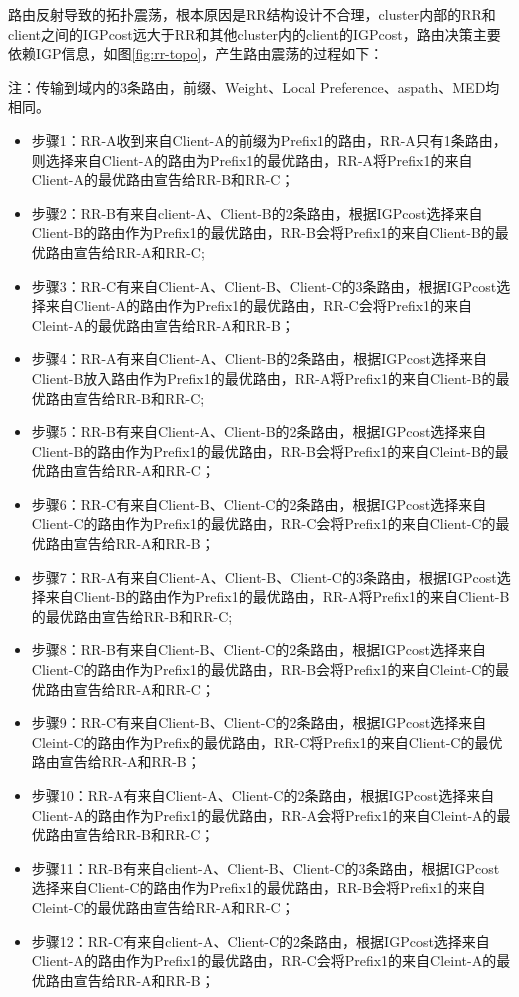 路由反射导致的拓扑震荡，根本原因是RR结构设计不合理，cluster内部的RR和client之间的IGPcost远大于RR和其他cluster内的client的IGPcost，路由决策主要依赖IGP信息，如图\ref{fig:rr-topo}，产生路由震荡的过程如下：

注：传输到域内的3条路由，前缀、Weight、Local Preference、aspath、MED均相同。

\begin{itemize}
\item 步骤1：RR-A收到来自Client-A的前缀为Prefix1的路由，RR-A只有1条路由，则选择来自Client-A的路由为Prefix1的最优路由，RR-A将Prefix1的来自Client-A的最优路由宣告给RR-B和RR-C；
\item 步骤2：RR-B有来自client-A、Client-B的2条路由，根据IGPcost选择来自Client-B的路由作为Prefix1的最优路由，RR-B会将Prefix1的来自Client-B的最优路由宣告给RR-A和RR-C;
\item 步骤3：RR-C有来自Client-A、Client-B、Client-C的3条路由，根据IGPcost选择来自Client-A的路由作为Prefix1的最优路由，RR-C会将Prefix1的来自Cleint-A的最优路由宣告给RR-A和RR-B；


\item 步骤4：RR-A有来自Client-A、Client-B的2条路由，根据IGPcost选择来自Client-B放入路由作为Prefix1的最优路由，RR-A将Prefix1的来自Client-B的最优路由宣告给RR-B和RR-C;
\item 步骤5：RR-B有来自Client-A、Client-B的2条路由，根据IGPcost选择来自Client-B的路由作为Prefix1的最优路由，RR-B会将Prefix1的来自Cleint-B的最优路由宣告给RR-A和RR-C；
\item 步骤6：RR-C有来自Client-B、Client-C的2条路由，根据IGPcost选择来自Client-C的路由作为Prefix1的最优路由，RR-C会将Prefix1的来自Client-C的最优路由宣告给RR-A和RR-B；


\item 步骤7：RR-A有来自Client-A、Client-B、Client-C的3条路由，根据IGPcost选择来自Client-B的路由作为Prefix1的最优路由，RR-A将Prefix1的来自Client-B的最优路由宣告给RR-B和RR-C;
\item 步骤8：RR-B有来自Client-B、Client-C的2条路由，根据IGPcost选择来自Client-C的路由作为Prefix1的最优路由，RR-B会将Prefix1的来自Cleint-C的最优路由宣告给RR-A和RR-C；
\item 步骤9：RR-C有来自Client-B、Client-C的2条路由，根据IGPcost选择来自Cleint-C的路由作为Prefix的最优路由，RR-C将Prefix1的来自Client-C的最优路由宣告给RR-A和RR-B；


\item 步骤10：RR-A有来自Client-A、Client-C的2条路由，根据IGPcost选择来自Client-A的路由作为Prefix1的最优路由，RR-A会将Prefix1的来自Cleint-A的最优路由宣告给RR-B和RR-C；
\item 步骤11：RR-B有来自client-A、Client-B、Client-C的3条路由，根据IGPcost选择来自Client-C的路由作为Prefix1的最优路由，RR-B会将Prefix1的来自Cleint-C的最优路由宣告给RR-A和RR-C；
\item 步骤12：RR-C有来自client-A、Client-C的2条路由，根据IGPcost选择来自Client-A的路由作为Prefix1的最优路由，RR-C会将Prefix1的来自Cleint-A的最优路由宣告给RR-A和RR-B；



\end{itemize}
